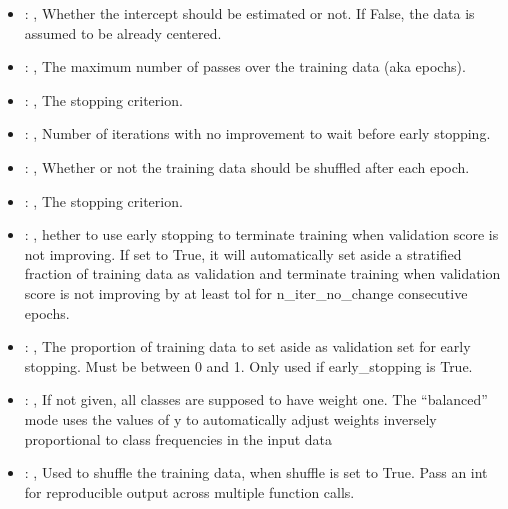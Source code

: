 \begin{itemize}
    \item {}: , 
      Whether the intercept should be estimated or not. If False,
      the data is assumed to be already centered.

    \item {}: , 
      The maximum number of passes over the training data (aka epochs).

    \item {}: , 
      The stopping criterion.

    \item {}: , 
      Number of iterations with no improvement to wait before early stopping.

    \item {}: , 
      Whether or not the training data should be shuffled after each epoch.

    \item {}: , 
      The stopping criterion.

    \item {}: , 
      hether to use early stopping to terminate training when validation score is not
      improving. If set to True, it will automatically set aside a stratified fraction of training
      data as validation and terminate training when validation score is not improving by at least
      tol for n\_iter\_no\_change consecutive epochs.

    \item {}: , 
      The proportion of training data to set aside as validation set for early stopping.
      Must be between 0 and 1. Only used if early\_stopping is True.

    \item {}: \xmlDesc{[balanced]}, 
      If not given, all classes are supposed to have weight one.
      The “balanced” mode uses the values of y to automatically adjust weights
      inversely proportional to class frequencies in the input data

    \item {}: , 
      Used to shuffle the training data, when shuffle is set to
      True. Pass an int for reproducible output across multiple function calls.


\end{itemize}
